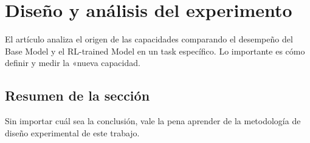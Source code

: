 \section{Diseño y análisis del experimento}
El artículo analiza el origen de las capacidades comparando el desempeño del Base Model y el RL-trained Model en un task específico. Lo importante es cómo definir y medir la «nueva capacidad.

\subsection{Resumen de la sección}
Sin importar cuál sea la conclusión, vale la pena aprender de la metodología de diseño experimental de este trabajo.

\newpage
